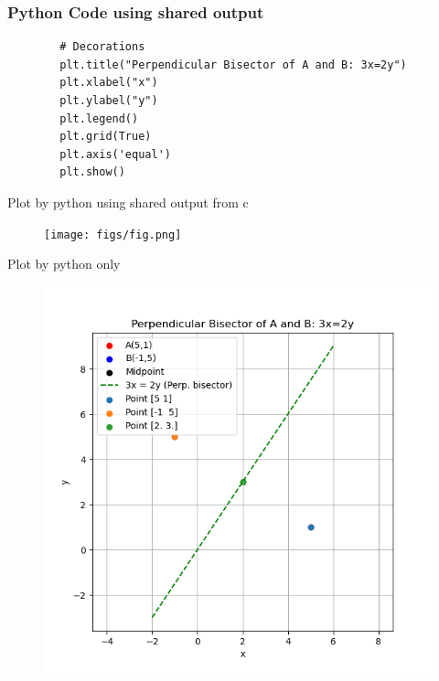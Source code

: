 \documentclass{beamer}
\begin{document}
\begin{frame}[fragile]
	\frametitle{Python Code using shared output}
	\begin{lstlisting}
		# Decorations
		plt.title("Perpendicular Bisector of A and B: 3x=2y")
		plt.xlabel("x")
		plt.ylabel("y")
		plt.legend()
		plt.grid(True)
		plt.axis('equal')
		plt.show()
	\end{lstlisting}
\end{frame}

\begin{frame}{Plot by python using shared output from c}
	\begin{center}
	\begin{figure}[H]
		\centering
		\texttt{[image: figs/fig.png]}
		\caption*{}
		\label{}
	\end{figure}
	\end{center}
\end{frame}
\begin{frame}{Plot by python only}
	\begin{center}
		\begin{figure}[H]
			\centering
			\includegraphics[width = 0.6\columnwidth]{figs/Figure_2.png}
			\caption*{}
			\label{}
		\end{figure}
	\end{center}
\end{frame}
\end{document}
